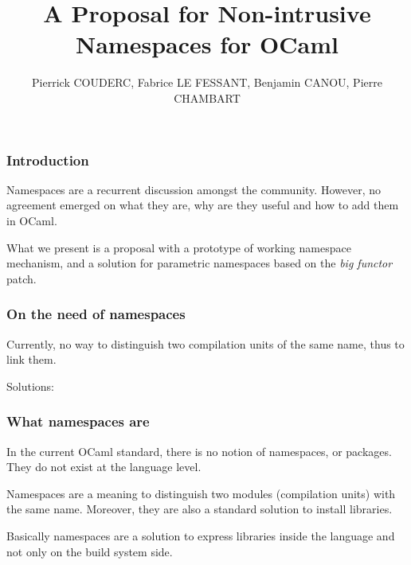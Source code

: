 \documentclass{beamer}
\author{Pierrick COUDERC, Fabrice LE FESSANT, Benjamin CANOU, Pierre CHAMBART}
\title{A Proposal for Non-intrusive Namespaces for OCaml}
\begin{document}
\maketitle

\begin{frame}
\frametitle{Introduction}

Namespaces are a recurrent discussion amongst the community. However, no
agreement emerged on what they are, why are they useful and how to add them in
OCaml.

\medskip

What we present is a proposal with a prototype of working namespace mechanism,
and a solution for parametric namespaces based on the \emph{big functor} patch.
\end{frame}

\begin{frame}[fragile]
\frametitle{On the need of namespaces}



Currently, no way to distinguish two compilation units of the same name, thus to
link them.

Solutions: 
\begin{itemize}
\end{itemize}
\end{frame}




\begin{frame}
\frametitle{What namespaces are}

In the current OCaml standard, there is no notion of namespaces, or
packages. They do not exist at the language level.

\medskip

Namespaces are a meaning to distinguish two modules (compilation units) with the
same name. Moreover, they are also a standard solution to install libraries.

\medskip

Basically namespaces are a solution to express libraries inside the language and
not only on the build system side. 

\end{frame}
\end{document}
